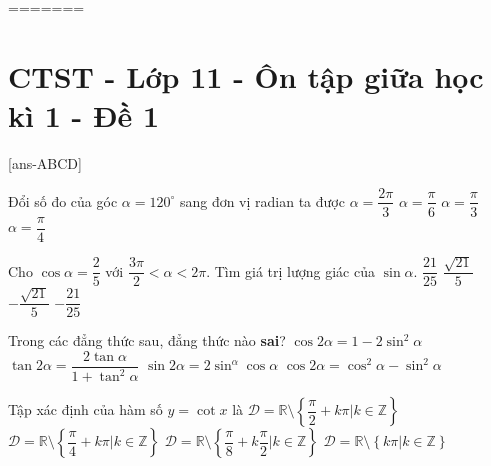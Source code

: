 

=======
\section{CTST - Lớp 11 - Ôn tập giữa học kì 1 - Đề 1}

\caulc

[ans-ABCD]

\begin{ex}%
Đổi số đo của góc $\alpha = 120^\circ$ sang đơn vị radian ta được
\choice
{\True $\alpha = \dfrac{2\pi}{3}$}
{$\alpha = \dfrac{\pi}{6}$}
{$\alpha = \dfrac{\pi}{3}$}
{$\alpha = \dfrac{\pi}{4}$}
\end{ex}

\begin{ex}%
Cho $\cos \alpha = \dfrac{2}{5}$ với $\dfrac{3\pi}{2} < \alpha < 2\pi$. Tìm giá trị lượng giác của $\sin \alpha$.
\choice
{$\dfrac{21}{25}$}
{$\dfrac{\sqrt{21}}{5}$}
{\True $-\dfrac{\sqrt{21}}{5}$}
{$-\dfrac{21}{25}$}
\end{ex}

\begin{ex}%
Trong các đẳng thức sau, đẳng thức nào \textbf{sai}?
\choice
{$\cos 2\alpha = 1 - 2 \sin^2 \alpha$}
{\True $\tan 2\alpha = \dfrac{2 \tan \alpha}{1+ \tan^2 \alpha}$}
{$\sin 2\alpha = 2 \sin^ \alpha \cos \alpha$}
{$\cos 2\alpha = \cos^2 \alpha - \sin^2 \alpha$}
\end{ex}

\begin{ex}%
Tập xác định của hàm số $y= \cot x$ là
\choice
{$\mathscr{D}= \mathbb{R} \setminus \left\{ \dfrac{\pi}{2} + k\pi | k \in \mathbb{Z} \right\}$}
{$\mathscr{D}= \mathbb{R} \setminus \left\{ \dfrac{\pi}{4} + k\pi | k \in \mathbb{Z} \right\}$}
{$\mathscr{D}= \mathbb{R} \setminus \left\{ \dfrac{\pi}{8} + k \dfrac{\pi}{2} | k \in \mathbb{Z} \right\}$}
{\True $\mathscr{D}= \mathbb{R} \setminus \left\{k\pi | k \in \mathbb{Z} \right\}$}
\end{ex}

